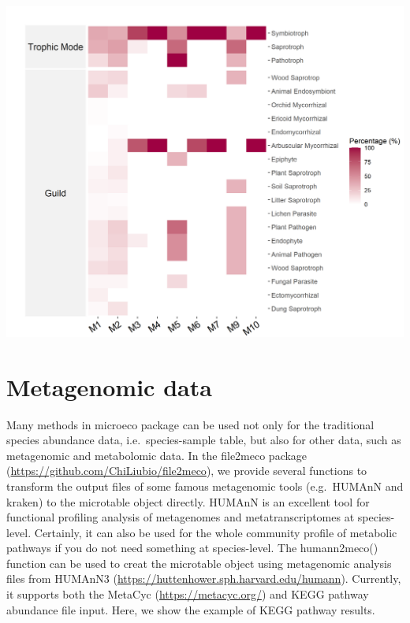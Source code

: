 \documentclass[
]{book}
\newenvironment{Shaded}{\begin{snugshade}}{\end{snugshade}}
\newcommand{\AttributeTok}[1]{\textcolor[rgb]{0.77,0.63,0.00}{#1}}
\newcommand{\CommentTok}[1]{\textcolor[rgb]{0.56,0.35,0.01}{\textit{#1}}}
\newcommand{\ConstantTok}[1]{\textcolor[rgb]{0.00,0.00,0.00}{#1}}
\newcommand{\DecValTok}[1]{\textcolor[rgb]{0.00,0.00,0.81}{#1}}
\newcommand{\FunctionTok}[1]{\textcolor[rgb]{0.00,0.00,0.00}{#1}}
\newcommand{\NormalTok}[1]{#1}
\newcommand{\SpecialCharTok}[1]{\textcolor[rgb]{0.00,0.00,0.00}{#1}}
\newcommand{\StringTok}[1]{\textcolor[rgb]{0.31,0.60,0.02}{#1}}
\begin{document}
\begin{Shaded}
\end{Shaded}

\begin{center}\includegraphics[width=700px]{Images/plot_func_perc_module_fungi} \end{center}

\hypertarget{metagenomic-data}{%
\section{Metagenomic data}\label{metagenomic-data}}

Many methods in microeco package can be used not only for the traditional species abundance data, i.e.~species-sample table,
but also for other data, such as metagenomic and metabolomic data.
In the file2meco package (\url{https://github.com/ChiLiubio/file2meco}),
we provide several functions to transform the output files of some famous metagenomic tools (e.g.~HUMAnN and kraken) to
the microtable object directly.
HUMAnN\citep{Franzosa_Species_2018} is an excellent tool for functional profiling analysis of metagenomes and metatranscriptomes at species-level.
Certainly, it can also be used for the whole community profile of metabolic pathways if you do not need something at species-level.
The humann2meco() function can be used to creat the microtable object using metagenomic analysis files from HUMAnN3 (\url{https://huttenhower.sph.harvard.edu/humann}).
Currently, it supports both the MetaCyc (\url{https://metacyc.org/}) and KEGG pathway abundance file input.
Here, we show the example of KEGG pathway results.
\end{document}
